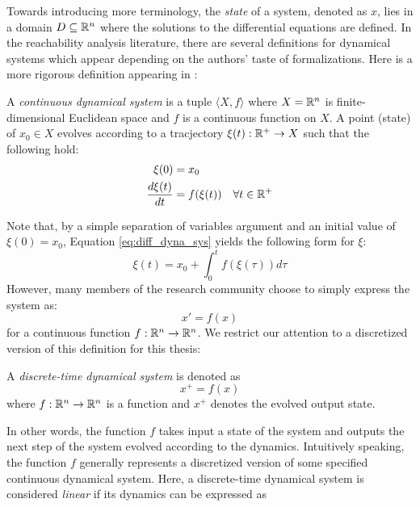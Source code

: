Towards introducing more terminology, the \emph{state} of a system, denoted as $x$, lies in a domain $D \subseteq {\mathbb{R}}^n$ where the solutions to the differential equations are defined.
%
In the reachability analysis literature, there are several definitions for dynamical systems which appear depending on the authors' taste of formalizations. Here is a more rigorous definition appearing in \cite{dang1998reachability}:
\begin{definition}
\label{def:diff_dyna_sys}
A \emph{continuous dynamical system} is a tuple $\langle X, f \rangle$ where $X = {\mathbb{R}}^n$ is finite-dimensional Euclidean space and $f$ is a continuous function on $X$. A point (state) of $x_0 \in X$ evolves according to a tracjectory $\xi(t): {\mathbb{R}}^+ \rightarrow X$ such that the following hold:
%
\begin{equation}
  \label{eq:diff_dyna_sys}
  \begin{split}
    \xi(0) & = x_0 \\
    \frac{d \xi(t)}{dt} & = f(\xi(t)) \quad \forall t \in {\mathbb{R}}^+
  \end{split}
\end{equation}
\end{definition}
%
\noindent Note that, by a simple separation of variables argument and an initial value of $\xi(0) = x_0$, Equation \ref{eq:diff_dyna_sys} yields the following form for $\xi$:
\begin{equation}
\xi(t) = x_0 + \int_0^t f(\xi(\tau)) d\tau
\end{equation}
%
\noindent However, many members of the research community choose to simply express the system as:
\begin{equation}
\label{eq:cont_dynas}
x' = f(x)
\end{equation}
for a continuous function $f:{\mathbb{R}}^n \rightarrow {\mathbb{R}}^n$. We restrict our attention to a discretized version of this definition for this thesis:
%
\begin{definition}
A \emph{discrete-time dynamical system} is denoted as
\begin{equation}
  x^{+} = f(x)
\label{eq:sys}
\end{equation}
where $f: {\mathbb{R}}^{n} \rightarrow {\mathbb{R}}^{n}$ is a function and $x^{+}$ denotes the evolved output state.
\end{definition}
%
 In other words, the function $f$ takes input a state of the system and outputs the next step of the system evolved according to the dynamics.
%
Intuitively speaking, the function $f$ generally represents a discretized version of some specified continuous dynamical system. Here, a discrete-time dynamical system is considered \emph{linear} if its dynamics can be expressed as

